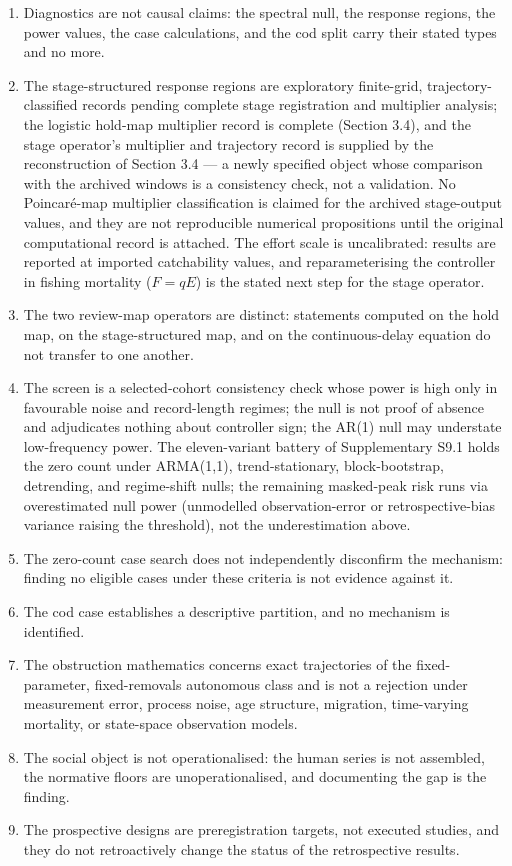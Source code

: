\documentclass[11pt]{article}
\providecommand{\tightlist}{\setlength{\itemsep}{0pt}\setlength{\parskip}{0pt}}
\begin{document}
\begin{enumerate}
\def\labelenumi{(\roman{enumi})}
\tightlist
\item Diagnostics are not causal claims: the spectral null, the response regions, the power values, the case calculations, and the cod split carry their stated types and no more.
\item The stage-structured response regions are exploratory finite-grid, trajectory-classified records pending complete stage registration and multiplier analysis; the logistic hold-map multiplier record is complete (Section 3.4), and the stage operator's multiplier and trajectory record is supplied by the reconstruction of Section 3.4 --- a newly specified object whose comparison with the archived windows is a consistency check, not a validation. No Poincar\'e-map multiplier classification is claimed for the archived stage-output values, and they are not reproducible numerical propositions until the original computational record is attached. The effort scale is uncalibrated: results are reported at imported catchability values, and reparameterising the controller in fishing mortality (\(F = qE\)) is the stated next step for the stage operator.
\item The two review-map operators are distinct: statements computed on the hold map, on the stage-structured map, and on the continuous-delay equation do not transfer to one another.
\item The screen is a selected-cohort consistency check whose power is high only in favourable noise and record-length regimes; the null is not proof of absence and adjudicates nothing about controller sign; the AR(1) null may understate low-frequency power. The eleven-variant battery of Supplementary S9.1 holds the zero count under ARMA(1,1), trend-stationary, block-bootstrap, detrending, and regime-shift nulls; the remaining masked-peak risk runs via overestimated null power (unmodelled observation-error or retrospective-bias variance raising the threshold), not the underestimation above.
\item The zero-count case search does not independently disconfirm the mechanism: finding no eligible cases under these criteria is not evidence against it.
\item The cod case establishes a descriptive partition, and no mechanism is identified.
\item The obstruction mathematics concerns exact trajectories of the fixed-parameter, fixed-removals autonomous class and is not a rejection under measurement error, process noise, age structure, migration, time-varying mortality, or state-space observation models.
\item The social object is not operationalised: the human series is not assembled, the normative floors are unoperationalised, and documenting the gap is the finding.
\item The prospective designs are preregistration targets, not executed studies, and they do not retroactively change the status of the retrospective results.
\end{enumerate}
\end{document}
